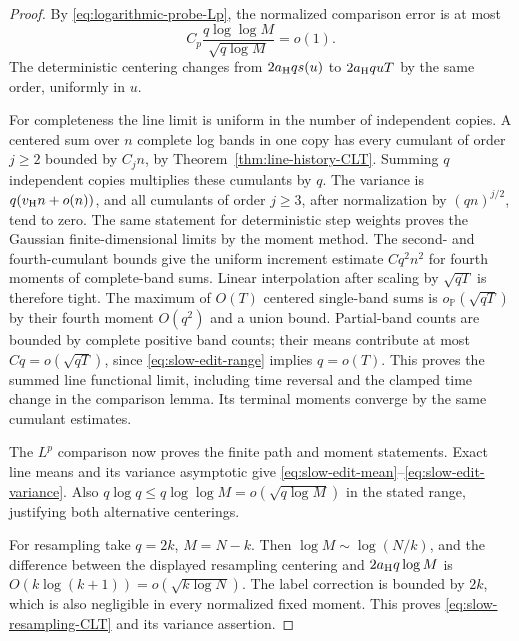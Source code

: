 \documentclass[11pt,letterpaper]{article}
\newcommand{\PP}{\mathbb P}\newcommand{\EE}{\mathbb E}
\begin{document}
\begin{proof}
By \eqref{eq:logarithmic-probe-Lp}, the normalized comparison
error is at most
\[
 C_p\frac{q\log\log M}{\sqrt{q\log M}}=o(1).
\]
The deterministic centering changes from $2a_{\rm H}q s(u)$ to
$2a_{\rm H}q uT$ by the same order, uniformly in $u$.

For completeness the line limit is uniform in the number of
independent copies. A centered sum over $n$ complete log bands
in one copy has every cumulant of order $j\ge2$ bounded by
$C_j n$, by Theorem~\ref{thm:line-history-CLT}.
Summing $q$ independent copies multiplies these cumulants by $q$.
The variance is $q(v_{\rm H}n+o(n))$, and all cumulants of order
$j\ge3$, after normalization by $(qn)^{j/2}$, tend to zero.
The same statement for deterministic step weights proves the
Gaussian finite-dimensional limits by the moment method.
The second- and fourth-cumulant bounds give the uniform increment
estimate $Cq^2n^2$ for fourth moments of complete-band sums.
Linear interpolation after scaling by $\sqrt{qT}$ is therefore
tight. The maximum of $O(T)$ centered single-band sums is
$o_{\PP}(\sqrt{qT})$ by their fourth moment $O(q^2)$ and a union
bound. Partial-band counts are bounded by complete positive band
counts; their means contribute at most $Cq=o(\sqrt{qT})$, since
\eqref{eq:slow-edit-range} implies $q=o(T)$.
This proves the summed line functional limit, including time
reversal and the clamped time change in the comparison lemma.
Its terminal moments converge by the same cumulant estimates.

The $L^p$ comparison now proves the finite path and moment
statements. Exact line means and its variance asymptotic give
\eqref{eq:slow-edit-mean}--\eqref{eq:slow-edit-variance}.
Also $q\log q\le q\log\log M=o(\sqrt{q\log M})$ in the stated
range, justifying both alternative centerings.

For resampling take $q=2k$, $M=N-k$. Then $\log M\sim\log(N/k)$,
and the difference between the displayed resampling centering
and $2a_{\rm H}q\log M$ is
$O(k\log(k+1))=o(\sqrt{k\log N})$.
The label correction is bounded by $2k$, which is also negligible
in every normalized fixed moment. This proves
\eqref{eq:slow-resampling-CLT} and its variance assertion.
\end{proof}
\end{document}
